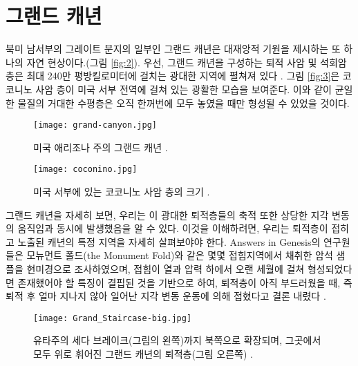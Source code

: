 \documentclass[10pt,twocolumn,letterpaper]{article}
\begin{document}
\section{그랜드 캐년}

북미 남서부의 그레이트 분지의 일부인 그랜드 캐년은 대재앙적 기원을 제시하는 또 하나의 자연 현상이다.(그림 \ref{fig:2}). 우선, 그랜드 캐년을 구성하는 퇴적 사암 및 석회암 층은 최대 240만 평방킬로미터에 걸치는 광대한 지역에 펼쳐져 있다 \cite{21}. 그림 \ref{fig:3}은 코코니노 사암 층이 미국 서부 전역에 걸쳐 있는 광활한 모습을 보여준다. 이와 같이 균일한 물질의 거대한 수평층은 오직 한꺼번에  모두 놓였을 때만 형성될 수 있었을 것이다.

\begin{figure}[b]
\begin{center}
   \texttt{[image: grand-canyon.jpg]}
\end{center}
   \caption{미국 애리조나 주의 그랜드 캐년 \cite{49}.}
\label{fig:2}
\label{fig:onecol}
\end{figure}

\begin{figure}[t]
\begin{center}
   \texttt{[image: coconino.jpg]}
\end{center}
   \caption{미국 서부에 있는 코코니노 사암 층의 크기 \cite{21}.}
\label{fig:3}
\label{fig:onecol}
\end{figure}

그랜드 캐년을 자세히 보면, 우리는 이 광대한 퇴적층들의 축적 또한  상당한 지각 변동의 움직임과 동시에 발생했음을 알 수 있다. 이것을 이해하려면, 우리는 퇴적층이 접히고 노출된 캐년의 특정 지역을 자세히 살펴보야야 한다.  Answers in Genesis의 연구원들은 \cite{42} 모뉴먼트 폴드(the Monument Fold)와 같은 몇몇 접힘지역에서 채취한 암석 샘플을 현미경으로 조사하였으며, 접힘이 열과 압력 하에서 오랜 세월에 걸쳐 형성되었다면 존재했어야 할 특징이 결핍된 것을 기반으로 하여, 퇴적층이 아직 부드러웠을 때, 즉 퇴적 후 얼마 지나지 않아 일어난 지각 변동 운동에 의해 접혔다고 결론 내렸다 \cite{43}.

\begin{figure*}
\begin{center}
\texttt{[image: Grand\_Staircase-big.jpg]}
\end{center}
   \caption{ 유타주의 세다 브레이크(그림의 왼쪽)까지 북쪽으로 확장되며, 그곳에서 모두 위로 휘어진 그랜드 캐년의 퇴적층(그림 오른쪽) \cite{50}.}
\label{fig:4}
\end{figure*}
\end{document}
